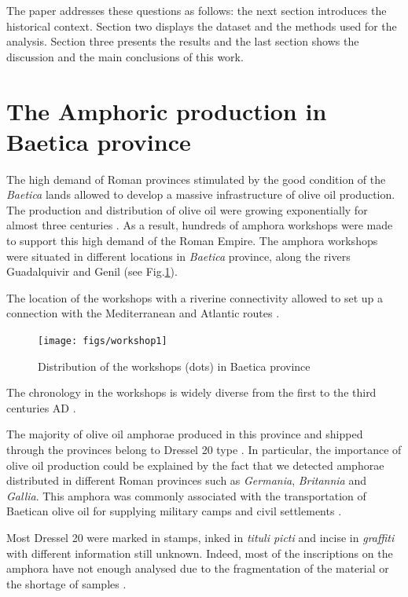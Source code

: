 \documentclass[review]{elsarticle}
\begin{document}
The paper addresses these questions as follows: the next section introduces the historical context. Section two displays the dataset and the methods used for the analysis. Section three presents the results and the last section shows the discussion and the main conclusions of this work. 


\section{The Amphoric production in Baetica province}

The high demand of Roman provinces stimulated by the good condition of the \textit{Baetica} lands allowed to develop a massive infrastructure of olive oil production. The production and distribution of olive oil were growing exponentially for almost three centuries \citep{remesal_concierto}. As a result, hundreds of amphora workshops were made to support this high demand of the Roman Empire. The amphora workshops were situated in different locations in \textit{Baetica} province, along the rivers Guadalquivir and Genil (see Fig.\ref{workshop}).

The location of the workshops with a riverine connectivity allowed to set up a connection with the Mediterranean and Atlantic routes \citep{garcia_vargas_enrique_formal_2010}.

\begin{figure}[htp]
	\centering
\texttt{[image: figs/workshop1]}
\caption{Distribution of the workshops (dots) in Baetica province}
\label{workshop}
\end{figure} 


The chronology in the workshops is widely diverse from the first to the third centuries AD \citep{millet_anforas_1998,rodriguez_baetican_1998,chic2005comercio}. 

The majority of olive oil amphorae produced in this province and shipped through the provinces belong to Dressel 20 type \citep{dressel_ricerche_1878,
millet_anforas_1998}. In particular, the importance of olive oil production could be explained by the fact that we detected amphorae distributed in different Roman provinces such as \textit{Germania}, \textit{Britannia} and \textit{Gallia}. This amphora was commonly associated with the  transportation of Baetican olive oil for supplying military camps and civil settlements \citep{berni_millet_epigrafianforica_2008}. 


Most Dressel 20 were marked in stamps, inked in \textit{tituli picti} and incise in \textit{graffiti} with different information still unknown. Indeed, most of the inscriptions on the amphora have not enough analysed due to the fragmentation of the material or the shortage of samples \citep{aguilera_evolucion_2007,rovira_guardiola_grafitos_2007}. 
\end{document}
